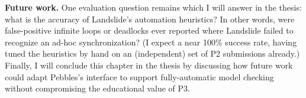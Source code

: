 {\bf Future work.}
One evaluation question remains which I will answer in the thesis:
what is the accuracy of Landslide's automation heuristics?
In other words, were false-positive infinite loops or deadlocks ever reported
where Landslide failed to recognize an ad-hoc synchronization?
(I expect a near 100\% success rate,
having tuned the heuristics by hand on an (independent) set of P2 submissions already.)
%
%
%
%
%
Finally, I will conclude this chapter in the thesis by discussing how future work could adapt Pebbles's interface to support fully-automatic model checking without compromising the educational value of P3.
